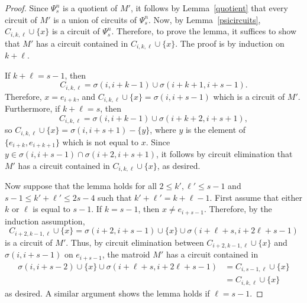 \documentclass[11pt]{amsart}
\begin{document}
\begin{proof}
Since $\Psi^n_s$ is a quotient of $M'$, it follows by Lemma~\ref{quotient} that every circuit of $M'$ is a union of circuits of $\Psi^n_s$. Now, by Lemma~\ref{psicircuits}, $C_{i, k, \ell}\cup \{x\}$ is a circuit of $\Psi^n_s$. Therefore, to prove the lemma, it suffices to show that $M'$ has a circuit contained in $C_{i, k, \ell} \cup \{x\}$. The proof is by induction on $k + \ell$.

If $k+\ell = s-1$, then
$$C_{i, k, \ell} = \sigma(i, i+k-1)\cup \sigma(i+k+1, i+s-1).$$
Therefore, $x = e_{i+k}$, and $C_{i, k, \ell}\cup \{x\} = \sigma(i, i+s-1)$ which is a circuit of $M'$. Furthermore, if $k+\ell = s$, then
$$C_{i, k, \ell} = \sigma(i, i+k-1)\cup \sigma(i+k+2, i+s+1),$$
so $C_{i, k, \ell}\cup \{x\} = \sigma(i, i+s+1) - \{y\}$, where $y$ is the element of $\{e_{i+k}, e_{i+k+1}\}$ which is not equal to $x$. Since $y\in \sigma(i, i+s-1)\cap \sigma(i+2, i+s+1)$, it follows by circuit elimination that $M'$ has a circuit contained in $C_{i, k,\ell} \cup \{x\}$, as desired.

Now suppose that the lemma holds for all $2\le k', \ell'\le s-1$ and $\left.s-1\le k'+\ell'\le 2s-4\right.$ such that $k'+\ell' = k+\ell-1$. First assume that either $k$ or $\ell$ is equal to $s-1$. If $k=s-1$, then $x\neq e_{i+s-1}$. Therefore, by the induction assumption,
$$C_{i+2, k-1, \ell}\cup \{x\}=\sigma(i+2, i+s-1)\cup \{x\}\cup \sigma(i+\ell+s, i+2\ell+s-1)$$
is a circuit of $M'$. Thus, by circuit elimination between $C_{i+2, k-1, \ell}\cup \{x\}$ and $\sigma(i, i+s-1)$ on $e_{i+s-1}$, the matroid $M'$ has a circuit contained in
\begin{align*}
\sigma(i, i+s-2)\cup \{x\}\cup \sigma(i+\ell+s, i+2\ell+s-1) & = C_{i, s-1, \ell}\cup \{x\} \\
& = C_{i, k, \ell}\cup \{x\}
\end{align*}
as desired. A similar argument shows the lemma holds if $\ell=s-1$.


\end{proof}
\end{document}
